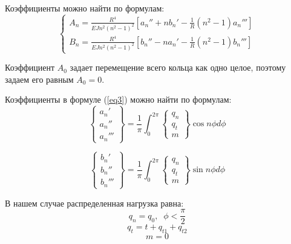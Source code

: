 Коэффициенты можно найти по формулам:
\begin{equation}
    \label{eq3}
    \begin{cases}
        \displaystyle A_n = \frac{R^4}{EJn^2(n^2-1)^2} \left[ a_n'' + nb_n' - \frac{1}{R}(n^2 - 1)a_n''' \right]
        \\[10pt]
        \displaystyle B_n = \frac{R^4}{EJn^2(n^2 - 1)^2} \left[ b_n'' - na_n' - \frac{1}{R}(n^2 - 1)b_n''' \right]
    \end{cases}
\end{equation}

Коэффициент $A_0$ задает перемещение всего кольца как одно целое, поэтому задаем его равным $A_0 = 0$.

Коэффициенты в формуле (\ref{eq3}) можно найти по формулам:
\begin{equation}
    \label{eq4}
    \left\{
        \begin{array}{lr}
            a_n'
            \\
            a_n''
            \\
            a_n'''
        \end{array}
    \right\}
    = \frac{1}{\pi} \int_{0}^{2\pi}
    \left\{ 
        \begin{array}{lr}
            q_n
            \\
            q_t
            \\
            m
        \end{array}
    \right\}
    \cos n \phi d \phi
\end{equation}

\begin{equation}
    \label{eq5}
    \left\{
        \begin{array}{lr}
            b_n'
            \\
            b_n''
            \\
            b_n'''
        \end{array}
    \right\}
    = \frac{1}{\pi} \int_{0}^{2\pi}
    \left\{ 
        \begin{array}{lr}
            q_n
            \\
            q_t
            \\
            m
        \end{array}
    \right\}
    \sin n \phi d \phi
\end{equation}

В нашем случае распределенная нагрузка равна:
\begin{equation}
    \label{eq6}
    q_{n} = q_0, \;\; \phi < \frac{\pi}{2}
\end{equation}
\begin{equation}
    \label{eq7}
    q_t = t + q_{t1} + q_{t2}
\end{equation}
\begin{equation}
    \label{eq8}
    m = 0
\end{equation}

